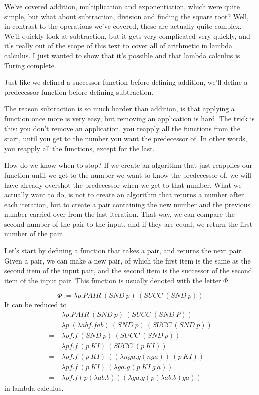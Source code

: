 \documentclass[11pt]{article}
\begin{document}
We've covered addition, multiplication and exponentiation, which were quite
simple, but what about subtraction, division and finding the square root? Well,
in contrast to the operations we've covered, these are actually quite complex.
We'll quickly look at subtraction, but it gets very complicated very quickly,
and it's really out of the scope of this text to cover all of arithmetic in
lambda calculus. I just wanted to show that it's possible and that lambda
calculus is Turing complete.

Just like we defined a successor function before defining addition, we'll
define a predecessor function before defining subtraction.


The reason subtraction is so much harder than addition, is that applying a
function once more is very easy, but removing an application is hard. The trick
is this: you don't remove an application, you reapply all the functions from
the start, until you get to the number you want the predecessor of. In other
words, you reapply all the functions, except for the last.

How do we know when to stop? If we create an algorithm that just reapplies our
function until we get to the number we want to know the predecessor of, we will
have already overshot the predecessor when we get to that number. What we
actually want to do, is not to create an algorithm that returns a number after
each iteration, but to create a pair containing the new number and the previous
number carried over from the last iteration. That way, we can compare the
second number of the pair to the input, and if they are equal, we return the
first number of the pair.

Let's start by defining a function that takes a pair, and returns the next
pair. Given a pair, we can make a new pair, of which the first item is the same
as the second item of the input pair, and the second item is the successor of
the second item of the input pair. This function is usually denoted with the
letter \(\Phi\).

\[\Phi:=\lambda p.PAIR\ (SND\ p)\ (SUCC\ (SND\ p))\]
It can be reduced to
\begin{align*}
	&\lambda p.PAIR\ (SND\ p)\ (SUCC\ (SND\ P))\\
	=\ &\lambda p.(\lambda abf.fab)\ (SND\ p)\ (SUCC\ (SND\ p))\\
	=\ &\lambda pf.f\ (SND\ p)\ (SUCC\ (SND\ p))\\
	=\ &\lambda pf.f\ (p\ KI)\ (SUCC\ (p\ KI))\\
	=\ &\lambda pf.f\ (p\ KI)\ ((\lambda nga.g(nga))\ (p\ KI))\\
	=\ &\lambda pf.f\ (p\ KI)\ (\lambda ga.g(p\ KI\ g\ a))\\
	=\ &\lambda pf.f(p(\lambda ab.b))(\lambda ga.g(p(\lambda ab.b)ga))
\end{align*}
in lambda calculus.
\end{document}

